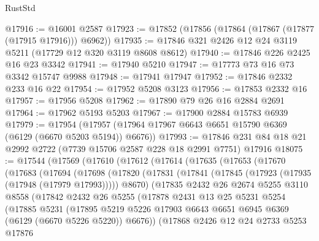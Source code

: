 \begin{lexlean}{RustStd}
\begin{coremodule}
@17916 := @16001 @2587
@17923 := @17852 (@17856 (@17864 (@17867 (@17877 (@17915 @17916))) @6962))
@17935 := @17846 @321 @2426 @12 @24 @3119 @5211 (@17729 @12 @320 @3119 @8608 @8612)
@17940 := @17846 @226 @2425 @16 @23 @3342
@17941 := @17940 @5210
@17947 := @17773 @73 @16 @73 @3342 @15747 @9988
@17948 := @17941 @17947
@17952 := @17846 @2332 @233 @16 @22
@17954 := @17952 @5208 @3123
@17956 := @17853 @2332 @16
@17957 := @17956 @5208
@17962 := @17890 @79 @26 @16 @2884 @2691
@17964 := @17962 @5193 @5203
@17967 := @17900 @2884 @15783 @6939
@17979 := @17954 (@17957 (@17964 @17967 @6643 @6651 @15790 @6369 (@6129 (@6670 @5203 @5194)) @6676))
@17993 := @17846 @231 @84 @18 @21 @2992 @2722 (@7739 @15706 @2587 @228 @18 @2991 @7751) @17916
@18075 := @17544
    (@17569
      (@17610
        (@17612
          (@17614
            (@17635
              (@17653
                (@17670
                  (@17683
                    (@17694
                      (@17698
                        (@17820
                          (@17831
                            (@17841 (@17845 (@17923 (@17935 (@17948 (@17979 @17993))))) @8670)
                            (@17835
                              @2432
                              @26
                              @2674
                              @5255
                              @3110
                              @8558
                              (@17842
                                @2432
                                @26
                                @5255
                                (@17878
                                  @2431
                                  @13
                                  @25
                                  @5231
                                  @5254
                                  (@17885
                                    @5231
                                    (@17895
                                      @5219
                                      @5226
                                      @17903
                                      @6643
                                      @6651
                                      @6945
                                      @6369
                                      (@6129 (@6670 @5226 @5220))
                                      @6676))
                                  (@17868
                                    @2426
                                    @12
                                    @24
                                    @2733
                                    @5253
                                    @17876

\end{coremodule}
\end{lexlean}
